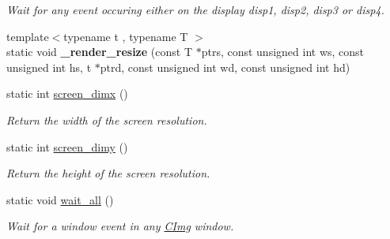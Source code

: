 \begin{DoxyCompactItemize}
\begin{DoxyCompactList}\small\item\em Wait for any event occuring either on the display {\ttfamily disp1}, {\ttfamily disp2}, {\ttfamily disp3} or {\ttfamily disp4}. \end{DoxyCompactList}\item 
\hypertarget{structcimg__library_1_1_c_img_display_a5b28d9800d10feb5a3cbd0c7c094ce0d}{{\footnotesize template$<$typename t , typename T $>$ }\\static void {\bfseries \-\_\-render\-\_\-resize} (const T $\ast$ptrs, const unsigned int ws, const unsigned int hs, t $\ast$ptrd, const unsigned int wd, const unsigned int hd)}\label{structcimg__library_1_1_c_img_display_a5b28d9800d10feb5a3cbd0c7c094ce0d}

\item 
\hypertarget{structcimg__library_1_1_c_img_display_a8365439b21d8cdf9624b2f208b563e83}{static int \hyperlink{structcimg__library_1_1_c_img_display_a8365439b21d8cdf9624b2f208b563e83}{screen\-\_\-dimx} ()}\label{structcimg__library_1_1_c_img_display_a8365439b21d8cdf9624b2f208b563e83}

\begin{DoxyCompactList}\small\item\em Return the width of the screen resolution. \end{DoxyCompactList}\item 
\hypertarget{structcimg__library_1_1_c_img_display_ac8b1cad117a01ad3d939892d1314e0d7}{static int \hyperlink{structcimg__library_1_1_c_img_display_ac8b1cad117a01ad3d939892d1314e0d7}{screen\-\_\-dimy} ()}\label{structcimg__library_1_1_c_img_display_ac8b1cad117a01ad3d939892d1314e0d7}

\begin{DoxyCompactList}\small\item\em Return the height of the screen resolution. \end{DoxyCompactList}\item 
\hypertarget{structcimg__library_1_1_c_img_display_a928bdc29039ee9369d3b38370f7b0f92}{static void \hyperlink{structcimg__library_1_1_c_img_display_a928bdc29039ee9369d3b38370f7b0f92}{wait\-\_\-all} ()}\label{structcimg__library_1_1_c_img_display_a928bdc29039ee9369d3b38370f7b0f92}

\begin{DoxyCompactList}\small\item\em Wait for a window event in any \hyperlink{structcimg__library_1_1_c_img}{C\-Img} window. \end{DoxyCompactList}\end{DoxyCompactItemize}
